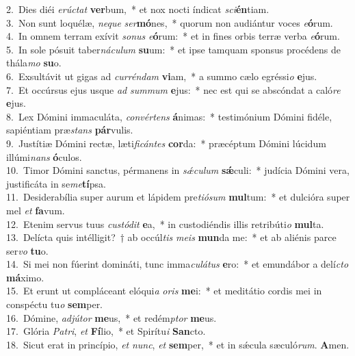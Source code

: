 {2.~}Dies diéi \textit{e}\textit{rú}\textit{ctat} \textbf{ver}bum,~* et nox nocti índicat \textit{sci}\textbf{én}tiam.\\
{3.~}Non sunt loquélæ, \textit{ne}\textit{que} \textit{ser}\textbf{mó}nes,~* quorum non audiántur voces \textit{e}\textbf{ó}rum.\\
{4.~}In omnem terram exívit \textit{so}\textit{nus} \textit{e}\textbf{ó}rum:~* et in fines orbis terræ verba \textit{e}\textbf{ó}rum.\\
{5.~}In sole pósuit taber\textit{ná}\textit{cu}\textit{lum} \textbf{su}um:~* et ipse tamquam sponsus procédens de thála\textit{mo} \textbf{su}o.\\
{6.~}Exsultávit ut gigas ad \textit{cur}\textit{rén}\textit{dam} \textbf{vi}am,~* a summo cælo egréssi\textit{o} \textbf{e}jus.\\
{7.~}Et occúrsus ejus usque \textit{ad} \textit{sum}\textit{mum} \textbf{e}jus:~* nec est qui se abscóndat a caló\textit{re} \textbf{e}jus.\\
{8.~}Lex Dómini immaculáta, \textit{con}\textit{vér}\textit{tens} \textbf{á}nimas:~* testimónium Dómini fidéle, sapiéntiam præ\textit{stans} \textbf{pár}vulis.\\
{9.~}Justítiæ Dómini rectæ, læti\textit{fi}\textit{cán}\textit{tes} \textbf{cor}da:~* præcéptum Dómini lúcidum illúmi\textit{nans} \textbf{ó}culos.\\
{10.~}Timor Dómini sanctus, pérmanens in \textit{sǽ}\textit{cu}\textit{lum} \textbf{sǽ}culi:~* judícia Dómini vera, justificáta in se\textit{me}\textbf{tí}psa.\\
{11.~}Desiderabília super aurum et lápidem pre\textit{ti}\textit{ó}\textit{sum} \textbf{mul}tum:~* et dulcióra super mel \textit{et} \textbf{fa}vum.\\
{12.~}Etenim servus tuus \textit{cu}\textit{stó}\textit{dit} \textbf{e}a,~* in custodiéndis illis retribúti\textit{o} \textbf{mul}ta.\\
{13.~}Delícta quis intélligit?~† ab occúl\textit{tis} \textit{me}\textit{is} \textbf{mun}da me:~* et ab aliénis parce ser\textit{vo} \textbf{tu}o.\\
{14.~}Si mei non fúerint domináti, tunc imma\textit{cu}\textit{lá}\textit{tus} \textbf{e}ro:~* et emundábor a delí\textit{cto} \textbf{má}ximo.\\
{15.~}Et erunt ut compláceant elóqui\textit{a} \textit{o}\textit{ris} \textbf{me}i:~* et meditátio cordis mei in conspéctu tu\textit{o} \textbf{sem}per.\\
{16.~}Dómine, \textit{ad}\textit{jú}\textit{tor} \textbf{me}us,~* et redém\textit{ptor} \textbf{me}us.\\
{17.~}Glória \textit{Pa}\textit{tri}, \textit{et} \textbf{Fí}lio,~* et Spirítu\textit{i} \textbf{San}cto.\\
{18.~}Sicut erat in princípio, \textit{et} \textit{nunc}, \textit{et} \textbf{sem}per,~* et in sǽcula sæculó\textit{rum}. \textbf{A}men.\\
